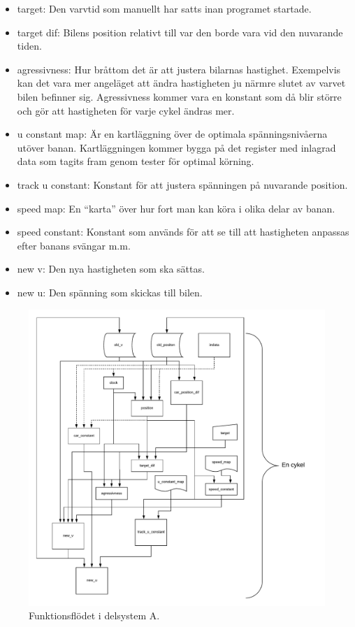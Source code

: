 \begin{itemize}
      \item target: Den varvtid som manuellt har satts inan programet startade.
      \item target dif: Bilens position relativt till var den borde vara vid den nuvarande tiden.
      \item agressivness: Hur bråttom det är att justera bilarnas hastighet. Exempelvis kan det vara mer angeläget att ändra hastigheten ju närmre slutet av varvet bilen befinner sig. Agressivness kommer vara en konstant som då blir större och gör att hastigheten för varje cykel ändras mer.
      \item u constant map: Är en kartläggning över de optimala spänningsnivåerna utöver banan. Kartläggningen kommer bygga på det register med inlagrad data som tagits fram genom tester för optimal körning.
      \item track u constant: Konstant för att justera spänningen på nuvarande position.
      \item speed map: En ``karta'' över hur fort man kan köra i olika delar av banan.
      \item speed constant: Konstant som används för att se till att hastigheten anpassas efter banans svängar m.m.
      \item new v: Den nya hastigheten som ska sättas.
      \item new u: Den spänning som skickas till bilen.
    \end{itemize}

    \begin{figure}
      \centering
      \includegraphics[width=\linewidth]{figures/flow.pdf}
      \caption{Funktionsflödet i delsystem A.}%
      \label{fig:flow_diagram}
    \end{figure}

